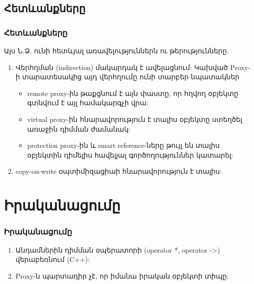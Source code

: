 \documentclass{beamer}
\begin{document}
\subsection{Հետևանքները}
\begin{frame}\frametitle{Հետևանքները}
Այս Ն.Ձ. ունի հետևյալ առավելություններն ու թերությունները.
\vfill
{}
\begin{enumerate}
    \item Վերհղման (indirection) մակարդակ է ավելացնում:
    Կախված Proxy-ի տարատեսակից այդ վերհղումը ունի տարբեր նպատակներ \vfill
    \begin{itemize}
        \item remote proxy-ին թաքցնում է այն փաստը, որ հղվող օբյեկտը գտնվում
        է այլ համակարգչի վրա: \vfill
        \item virtual proxy-ին հնարավորություն է տալիս օբյեկտը ստեղծել
        առաջին դիմման ժամանակ: \vfill
        \item protection proxy-ին և smart reference-ները թույլ են տալիս օբյեկտին
        դիմելիս հավելյալ գործողություններ կատարել: \vfill
    \end{itemize}
    \item copy-on-write օպտիմիզացիաի հնարավորություն է տալիս:
\end{enumerate}
\end{frame}

\section{Իրականացումը}
\begin{frame}\frametitle{Իրականացումը}
\begin{enumerate}
    \item Անդամներին դիմման օպերատորի (operator *, operator ->) վերաբեռնում (C++): \vfill
    \item Proxy-ն պարտադիր չէ, որ իմանա իրական օբյեկտի տիպը:
\end{enumerate}
\end{frame}
\end{document}
